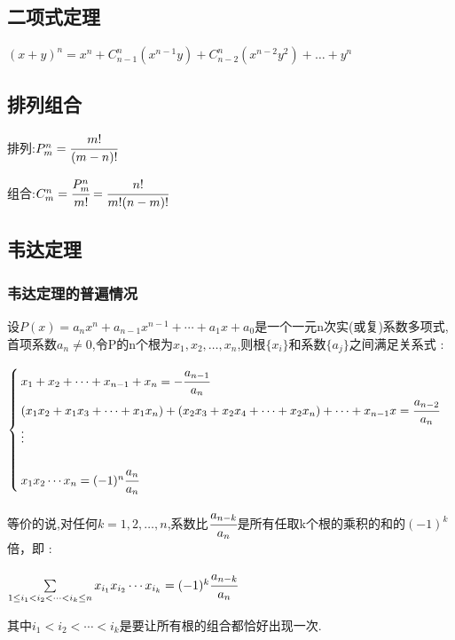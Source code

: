 \documentclass[UTF8,12pt]{ctexbook}
\newcommand{\mathCombination}[2]{C_{#1}^{#2}}
\newcommand{\mathPermutation}[2]{P_{#1}^{#2}}
\begin{document}
{{\subsection{二项式定理}{
  $(x + y)^n = x^n + \mathCombination{n - 1}{n}(x^{n-1} y) + \mathCombination{n - 2}{n}(x^{n-2} y^2) + \dots + y^n$
}%

\subsection{排列组合}{

  排列:$\mathPermutation{m}{n} = \cfrac{m!}{(m-n)!}$

  组合:$\mathCombination{m}{n} = \cfrac{\mathPermutation{m}{n}}{m!} = \cfrac{n!}{m!(n-m)!}$
}%

\subsection{韦达定理}{
\subsubsection{韦达定理的普遍情况}{
设$P(x) = a_nx^n + a_{n-1}x^{n-1} + \dotsm + a_1x + a_0$是一个一元n次实(或复)系数多项式,首项系数$a_n \neq 0$,令P的n个根为$x_1,x_2,\dots,x_n$,则根$\{x_i\}$和系数$\{a_j\}$之间满足关系式 :

$$
  \begin{cases}
    x_1 + x_2 + \dotsm + x_{n-1} + x_n = -\cfrac{a_{n-1}}{a_n}                                                           \\
    (x_1x_2 + x_1x_3 + \dotsm + x_1x_n) + (x_2x_3 + x_2x_4 + \dotsm + x_2x_n) + \dotsm + x_{n-1}x = \cfrac{a_{n-2}}{a_n} \\
    \vdots                                                                                                               \\                                                                                                               \\
    x_1x_2 \dotsm x_n = (-1)^n\cfrac{a_n}{a_n}
  \end{cases}
$$

等价的说,对任何$k = 1,2,\dots,n$,系数比$\cfrac{a_{n-k}}{a_n}$是所有任取k个根的乘积的和的$(-1)^k$倍，即 :

$\sum\limits_{1 \leq i_1 < i_2 < \dotsm < i_k \leq n}x_{i_{1}}x_{i_{2}} \dotsm x_{i_{k}} = (-1)^k\cfrac{a_{n-k}}{a_n}$

其中$i_1 < i_2 < \dotsm < i_k$是要让所有根的组合都恰好出现一次.

}}}}
\end{document}
